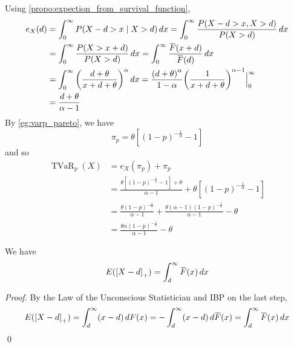 \documentclass[notoc,notitlepage]{tufte-book}
\DeclareMathOperator{\TVaR}{TVaR}
\begin{document}
\begin{solution}
  Using \cref{propo:expection_from_survival_function},
  \begin{align*}
    e_X(d) &= \int_{0}^{\infty} P(X - d > x \mid X > d) \dif{x} = \int_{0}^{\infty} \frac{P(X - d > x, X > d)}{P(X > d)} \dif{x} \\
           &= \int_{0}^{\infty} \frac{P(X > x + d)}{P(X > d)} \dif{x} = \int_{0}^{\infty} \frac{\bar{F}(x + d)}{\bar{F}(d)} \dif{x} \\
           &= \int_{0}^{\infty} {\left( \frac{d + \theta}{x + d + \theta} \right)}^\alpha \dif{x} = \frac{{( d + \theta )}^\alpha}{1 - \alpha} {\left( \frac{1}{x + d + \theta} \right)}^{ \alpha - 1 } \at{0}{\infty} \\
           &= \frac{d + \theta}{\alpha - 1}
  \end{align*}
  By \cref{eg:varp_pareto}, we have
  \begin{equation*}
    \pi_p = \theta \left[ {( 1 - p )}^{-\frac{1}{\alpha}} - 1 \right]
  \end{equation*}
  and so
  \begin{align*}
    \TVaR_p(X) &= e_X(\pi_p) + \pi_p \\
               &= \frac{\theta\left[ {(1 - p)}^{-\frac{1}{\alpha}} - 1 \right] + \theta}{\alpha - 1} + \theta\left[ {( 1 - p )}^{-\frac{1}{\alpha}} - 1 \right] \\
               &= \frac{\theta{(1 - p)}^{-\frac{1}{\alpha}}}{\alpha - 1} + \frac{\theta(\alpha - 1){(1 - p)}^{-\frac{1}{\alpha}}}{\alpha - 1} - \theta \\
               &= \frac{\theta \alpha {( 1 - p )}^{-\frac{1}{\alpha}}}{\alpha - 1} - \theta
  \end{align*}
\end{solution}

\begin{propo}\label{propo:expected_deductible}
  We have
  \begin{equation*}
    E( {[ X - d ]}_+ ) = \int_{d}^{\infty} \bar{F}(x) \dif{x}
  \end{equation*}
\end{propo}

\begin{proof}
  By the Law of the Unconscious Statistician and IBP on the last step,
  \begin{equation*}
    E( {[ X - d ]}_+ ) = \int_{d}^{\infty} ( x - d ) \dif{F(x)} = - \int_{d}^{\infty} (x - d) \dif{\bar{F}(x)} = \int_{d}^{\infty} \bar{F}(x) \dif{x}
  \end{equation*}\qed\
\end{proof}
\end{document}
